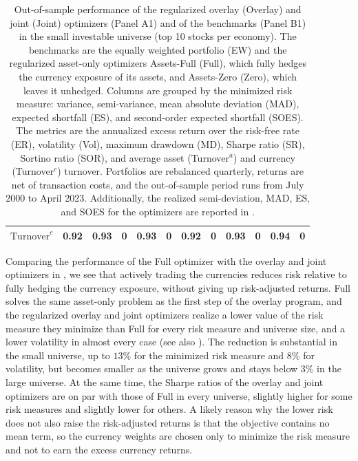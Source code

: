 \begin{table}[tbp]
{\begin{tabular}{l*{11}{c}}
    $\text{Turnover}^c$      & 0.92             & 0.93             & 0                & 0.93             & 0                & 0.92             & 0                & 0.93             & 0                & 0.94             & 0 \\
    \bottomrule
  \end{tabular}%
}
  \caption{Out-of-sample performance of the regularized overlay (Overlay) and joint (Joint) optimizers (Panel A1) and of the benchmarks (Panel B1) in the small investable universe (top 10 stocks per economy). The benchmarks are the equally weighted portfolio (EW) and the regularized asset-only optimizers Assets-Full (Full), which fully hedges the currency exposure of its assets, and Assets-Zero (Zero), which leaves it unhedged. Columns are grouped by the minimized risk measure: variance, semi-variance, mean absolute deviation (MAD), expected shortfall (ES), and second-order expected shortfall (SOES). The metrics are the annualized excess return over the risk-free rate (ER), volatility (Vol), maximum drawdown (MD), Sharpe ratio (SR), Sortino ratio (SOR), and average asset (Turnover$^a$) and currency (Turnover$^c$) turnover. Portfolios are rebalanced quarterly, returns are net of transaction costs, and the out-of-sample period runs from July 2000 to April 2023. Additionally, the realized semi-deviation, MAD, ES, and SOES for the optimizers are reported in .}
  \label{tab:regularized-top10}
\end{table}

Comparing the performance of the Full optimizer with the overlay and joint optimizers in
, we see that actively trading the currencies
reduces risk relative to fully hedging the currency exposure, without giving up risk-adjusted returns. Full solves the
same asset-only problem as the first step of the overlay program, and the regularized overlay and joint optimizers
realize a lower value of the risk measure they minimize than Full for every risk measure and universe size, and a lower
volatility in almost every case (see also ). The reduction is substantial in the small
universe, up to $13\%$ for the minimized risk measure and $8\%$ for volatility, but becomes smaller as the universe
grows and stays below $3\%$ in the large universe. At the same time, the Sharpe ratios of the overlay and joint
optimizers are on par with those of Full in every universe, slightly higher for some risk measures and slightly lower
for others. A likely reason why the lower risk does not also raise the risk-adjusted returns is that the objective
contains no mean term, so the currency weights are chosen only to minimize the risk measure and not to earn the excess
currency returns. 

